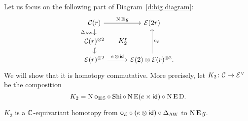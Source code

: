Let us focus on the following part of Diagram~\eqref{d:big diagram}:
\begin{equation*}
	\begin{tikzcd}[row sep=small]
		\cC(r)
		\arrow[r,"\chains\EE g"]
		\arrow[d,"\Delta_{\AW}"']
		\arrow[ddr,phantom,"K_2^r",shift left=0pt]
		&[5pt] \BE(2r)
		\\
		\cC(r)^{\ot 2}
		\arrow[d,hook] & \\
		\BE(r)^{\ot 2}
		\arrow[r,"e\, \ot\, \id"]
		& \BE(2) \ot \BE(r)^{\ot 2}.
		\arrow[uu,"\bcomp_\BE"']
	\end{tikzcd}
\end{equation*}
We will show that it is homotopy commutative.
More precisely, let $K_2 \colon \mathcal{C} \to \mathcal{E}^\vee$ be the composition
\[
K_2 = \operatorname{N}\bm{\mathbin{\circ}}_{\operatorname{E}\mathbb{S}} \mathbin{\circ} \operatorname{Shi} \mathbin{\circ} \operatorname{N}\operatorname{E}(e \times \mathsf{id}) \mathbin{\circ} \operatorname{N}\operatorname{E}\mathrm{D}.
\]

\begin{lemma}\label{l:K2}
	$K_2$ is a $\mathbb{C}$-equivariant homotopy from $\bm{\mathbin{\circ}}_{\mathcal{E}} \mathbin{\circ} (e \otimes \mathsf{id}) \mathbin{\circ} \Delta_{\operatorname{AW}}$ to $\operatorname{N}\operatorname{E} g$.
\end{lemma}

